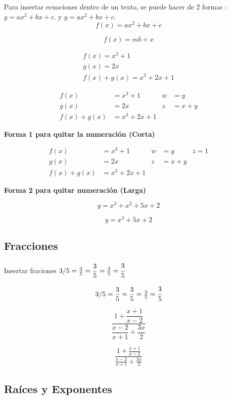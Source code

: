 \documentclass[12pt,letterpaper, onecolumn]{article}
\begin{document}
Para insertar ecuaciones dentro de un texto, se puede hacer de 2 formas : $ y=ax^2+bx+c $. y \( y=ax^2+bx+c \).
\\
\begin{equation}
    f(x)=ax^2+bx+c
\end{equation}

\begin{equation}
    f(x)=mb+x
    \label{Ec_recta}
\end{equation}

\begin{align}
    f(x)=x^3+1 \\
    g(x)=2x \\
    f(x)+g(x)=x^3+2x+1
\end{align}


\begin{align}
    \tag{1.1} f(x) &=x^3+1   & w &=y \\
    \tag{1.2} g(x) &=2x & z &=x+y\\
    \tag{A}   f(x)+g(x) &=x^3+2x+1
\end{align}

\textbf{Forma 1 para quitar la numeración (Corta)}

\begin{align*}
    f(x) &=x^3+1    & w &=y  & z=1\\
    g(x) &=2x       & z &=x+y\\
    f(x)+g(x) &=x^3+2x+1
\end{align*}

\textbf{Forma 2 para quitar numeración (Larga)}

$$ y= x^3+x^2+5x+2 $$

$$ y= x^3+5x+2 $$


\subsection{Fracciones}

Insertar fraciones $ 3/5 = \frac{3}{5} = \dfrac{3}{5} = \tfrac{3}{5} = \cfrac{3}{5} $


$$ 3/5 = \frac{3}{5} = \dfrac{3}{5} = \tfrac{3}{5} = \cfrac{3}{5} $$

$$ \dfrac{ 1+\dfrac{x+1}{x-2} } {\dfrac{x-2}{x+1}+\dfrac{3x}{2}} $$

$$ \frac{ 1+\frac{x+1}{x-2} } {\frac{x-2}{x+1}+\frac{3x}{2}} $$

\subsection{Raíces y Exponentes}
\end{document}
